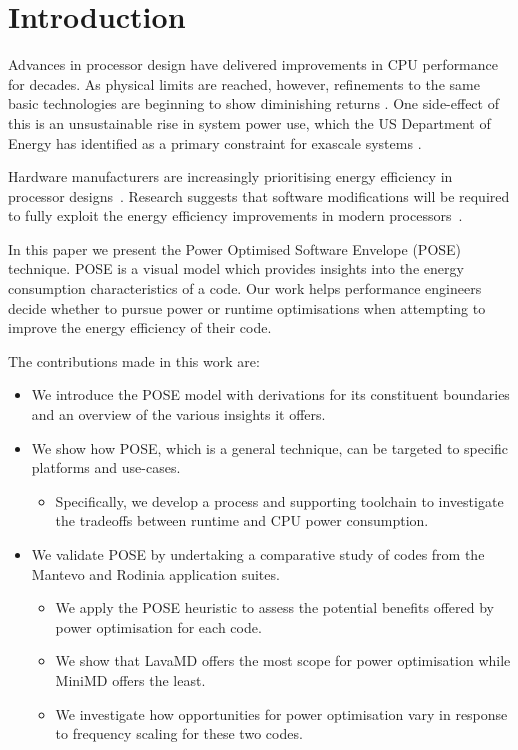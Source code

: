 \section{Introduction}
Advances in processor design have delivered improvements in CPU performance for decades. As physical limits are reached, however, refinements to the same basic technologies are beginning to show diminishing returns \cite{esmaeilzadeh:2011aa}. One side-effect of this is an unsustainable rise in system power use, which the US Department of Energy has identified as a primary constraint for exascale systems \cite{shalf:2011aa}.

Hardware manufacturers are increasingly prioritising energy efficiency in processor designs~\cite{kurd:2014aa}. 
Research suggests that software modifications will be required to fully exploit the energy efficiency improvements in modern processors~\cite{shao:2013aa}.

In this paper we present the Power Optimised Software Envelope (POSE) technique.
POSE is a visual model which provides insights into the energy consumption characteristics of a code.
Our work helps performance engineers decide whether to pursue power or runtime optimisations when attempting to improve the energy efficiency of their code.

\medskip \noindent
The contributions made in this work are:
\begin{itemize}
  \item We introduce the POSE model with derivations for its constituent boundaries and an overview of the various insights it offers.
  \item We show how POSE, which is a general technique, can be targeted to specific platforms and use-cases. 
  \begin{itemize}
    \item Specifically, we develop a process and supporting toolchain to investigate the tradeoffs between runtime and CPU power consumption.
  \end{itemize}
  \item We validate POSE by undertaking a comparative study of codes from the Mantevo and Rodinia application suites.
  \begin{itemize}
    \item We apply the POSE heuristic to assess the potential benefits offered by power optimisation for each code.
    \item We show that LavaMD offers the most scope for power optimisation while MiniMD offers the least.
    \item We investigate how opportunities for power optimisation vary in response to frequency scaling for these two codes.
  \end{itemize}
\end{itemize}

